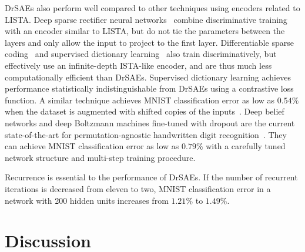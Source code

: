 \documentclass{article} %
\begin{document}
DrSAEs also perform well compared to other techniques using encoders related to LISTA.  Deep sparse rectifier neural networks~\citep{glorot2011} combine discriminative training with an encoder similar to LISTA, but do not tie the parameters between the layers and only allow the input to project to the first layer.  %
Differentiable sparse coding~\citep{bradley2008} and supervised dictionary learning~\citep{mairal2009} also train discriminatively, but effectively use an infinite-depth ISTA-like encoder, and are thus much less computationally efficient than DrSAEs.  Supervised dictionary learning achieves performance statistically indistinguishable from DrSAEs using a contrastive loss function. %
A similar technique achieves MNIST classification error as low as $0.54\%$ when the dataset is augmented with shifted copies of the inputs~\citep{mairal2012}.
Deep belief networks and deep Boltzmann machines fine-tuned with dropout are the current state-of-the-art for permutation-agnostic handwritten digit recognition~\citep{hinton2012}.  They can achieve MNIST classification error as low as $0.79\%$ with a carefully tuned network structure and multi-step training procedure.

Recurrence is essential to the performance of DrSAEs.  If the number of recurrent iterations is decreased from eleven to two, MNIST classification error in a network with 200 hidden units increases from $1.21\%$ to $1.49\%$.

\section{Discussion}
\end{document}
